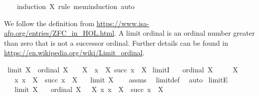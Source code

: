 \begin{isabellebody}
\ \ \isamarkupfalse%
\ {\isacharparenleft}{\kern0pt}induction\ X\ rule{\isacharcolon}{\kern0pt}\ mem{\isacharunderscore}{\kern0pt}induction{\isacharparenright}{\kern0pt}\ auto%
\endisatagproof
{\isafoldproof}%
%
\isadelimproof
%
\endisadelimproof
%
\isadelimdocument
%
\endisadelimdocument
%
\isatagdocument
%
\isamarkuptrue%
%
\endisatagdocument
{\isafolddocument}%
%
\isadelimdocument
%
\endisadelimdocument
%
\begin{isamarkuptext}%
We follow the definition from \url{https://www.isa-afp.org/entries/ZFC_in_HOL.html}.
A limit ordinal is an ordinal number greater than zero that is not a successor ordinal.
Further details can be found in \url{https://en.wikipedia.org/wiki/Limit_ordinal}.%
\end{isamarkuptext}\isamarkuptrue%
\isamarkupfalse%
\ {\isachardoublequoteopen}limit\ X\ {\isasymequiv}\ ordinal\ X\ {\isasymand}\ {}\ {\isasymin}\ X\ {\isasymand}\ {\isacharparenleft}{\kern0pt}{\isasymforall}x\ {\isasymin}\ X{\isachardot}{\kern0pt}\ succ\ x\ {\isasymin}\ X{\isacharparenright}{\kern0pt}{\isachardoublequoteclose}\isanewline
\isanewline
{}\isamarkupfalse%
\ limitI{\isacharcolon}{\kern0pt}\isanewline
\ \ \ {\isachardoublequoteopen}ordinal\ X{\isachardoublequoteclose}\isanewline
\ \ \ {\isachardoublequoteopen}{}\ {\isasymin}\ X{\isachardoublequoteclose}\isanewline
\ \ \ {\isachardoublequoteopen}{\isasymAnd}x{\isachardot}{\kern0pt}\ x\ {\isasymin}\ X\ {\isasymLongrightarrow}\ succ\ x\ {\isasymin}\ X{\isachardoublequoteclose}\isanewline
\ \ \ {\isachardoublequoteopen}limit\ X{\isachardoublequoteclose}\isanewline
%
\isadelimproof
\ \ %
\endisadelimproof
%
\isatagproof
{}\isamarkupfalse%
\ assms\ \isamarkupfalse%
\ limit{\isacharunderscore}{\kern0pt}def\ \isamarkupfalse%
\ auto%
\endisatagproof
{\isafoldproof}%
%
\isadelimproof
\isanewline
%
\endisadelimproof
\isanewline
{}\isamarkupfalse%
\ limitE{\isacharcolon}{\kern0pt}\isanewline
\ \ \ {\isachardoublequoteopen}limit\ X{\isachardoublequoteclose}\isanewline
\ \ \ {\isachardoublequoteopen}ordinal\ X{\isachardoublequoteclose}\ {\isachardoublequoteopen}{}\ {\isasymin}\ X{\isachardoublequoteclose}\ {\isachardoublequoteopen}{\isasymAnd}x{\isachardot}{\kern0pt}\ x\ {\isasymin}\ X\ {\isasymLongrightarrow}\ succ\ x\ {\isasymin}\ X{\isachardoublequoteclose}\isanewline

\end{isabellebody}
